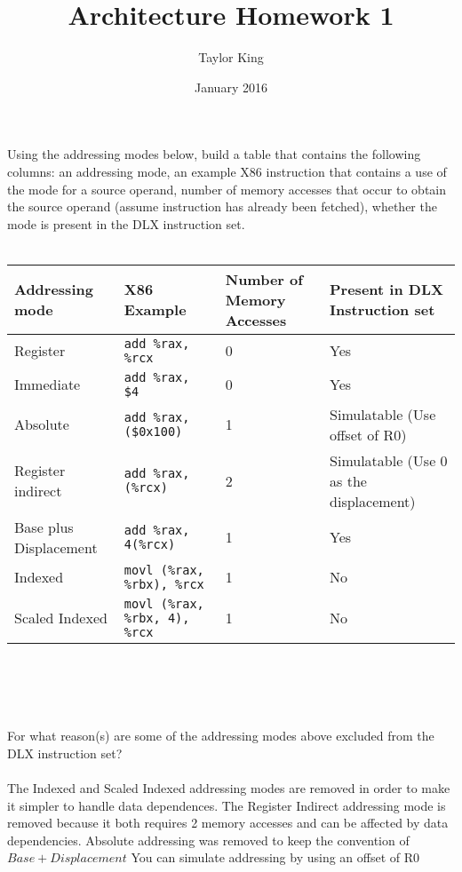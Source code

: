 \documentclass{article}
\title{Architecture Homework 1}
\author{Taylor King }
\date{January 2016}
\begin{document}
\maketitle

\section{}
Using the addressing modes below, build a table that contains the following columns: an addressing mode, an example X86 instruction that contains a use of the mode for a source operand, number of memory accesses that occur to obtain the source operand (assume instruction has already been fetched), whether the mode is present in the DLX instruction set.
\\
\\


\begin{tabular}{|p{3cm}|p{3cm}|p{3cm}|p{3cm}|}
    \hline
    Addressing mode & X86 Example & Number of Memory Accesses & Present in DLX Instruction set \\
    \hline
    Register & \texttt{add \%rax, \%rcx} & 0 & Yes \\
    Immediate & \texttt{add \%rax, \$4} & 0 & Yes \\
    Absolute & \texttt{add \%rax, (\$0x100)} & 1 & Simulatable (Use offset of R0) \\
    Register indirect & \texttt{add \%rax, (\%rcx)} & 2 & Simulatable (Use 0 as the displacement) \\ 
    Base plus Displacement & \texttt{add \%rax, 4(\%rcx)} & 1 & Yes\\ 
    Indexed & \texttt{movl (\%rax, \%rbx), \%rcx} & 1 & No \\ 
    Scaled Indexed & \texttt{movl (\%rax, \%rbx, 4), \%rcx} & 1 & No \\
    \hline
\end{tabular}
\\
\\

\section{} 

For what reason(s) are some of the addressing modes above excluded from the DLX instruction set?\\
\\
The Indexed and Scaled Indexed addressing modes are removed in order to make it simpler to handle data dependences. The Register Indirect addressing mode is removed because it both requires 2 memory accesses and can be affected by data dependencies. Absolute addressing was removed to keep the convention of $Base + Displacement$ You can simulate addressing by using an offset of R0
\end{document}
